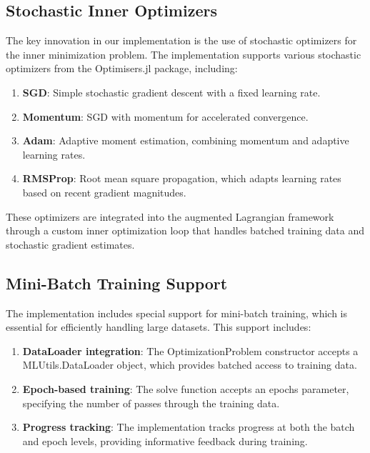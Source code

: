 \subsection{Stochastic Inner Optimizers}

The key innovation in our implementation is the use of stochastic optimizers for the inner minimization problem. The implementation supports various stochastic optimizers from the Optimisers.jl package, including:

\begin{enumerate}
\item \textbf{SGD}: Simple stochastic gradient descent with a fixed learning rate.

\item \textbf{Momentum}: SGD with momentum for accelerated convergence.

\item \textbf{Adam}: Adaptive moment estimation, combining momentum and adaptive learning rates.

\item \textbf{RMSProp}: Root mean square propagation, which adapts learning rates based on recent gradient magnitudes.
\end{enumerate}

These optimizers are integrated into the augmented Lagrangian framework through a custom inner optimization loop that handles batched training data and stochastic gradient estimates.

\subsection{Mini-Batch Training Support}

The implementation includes special support for mini-batch training, which is essential for efficiently handling large datasets. This support includes:

\begin{enumerate}
\item \textbf{DataLoader integration}: The OptimizationProblem constructor accepts a MLUtils.DataLoader object, which provides batched access to training data.

\item \textbf{Epoch-based training}: The solve function accepts an epochs parameter, specifying the number of passes through the training data.

\item \textbf{Progress tracking}: The implementation tracks progress at both the batch and epoch levels, providing informative feedback during training.
\end{enumerate}

